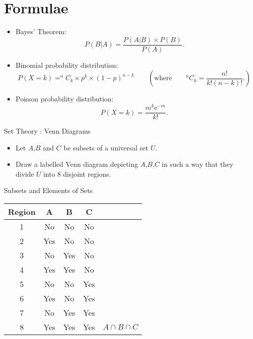 \section*{Formulae}
\begin{itemize}




\item Bayes' Theorem:
\begin{equation*}
P(B|A)=\frac{P\left(A|B\right) \times P(B) }{P\left( A\right) }.
\end{equation*}



\item Binomial probability distribution:
\begin{equation*}
P(X = k) = ^{n}C_{k} \times p^{k} \times \left( 1-p\right) ^{n-k}\qquad \left( \text{where}\qquad
^{n}C_{k} =\frac{n!}{k!\left(n-k\right) !}. \right)
\end{equation*}

\item Poisson probability distribution:
\begin{equation*}
P(X = k) =\frac{m^{k}\mathrm{e}^{-m}}{k!}.
\end{equation*}
\end{itemize}




{Set Theory : Venn Diagrams}

\begin{itemize}
\item Let $A$,$B$ and $C$ be subsets of a universal set $U$.
\item Draw a labelled Venn diagram depicting $A$,$B$,$C$ in such a way that they divide $U$ into 8 disjoint regions.
\end{itemize}



{Subsets and Elements of Sets}

\begin{center}
\begin{tabular}{|c|c|c|c|c|}
\hline Region & A & B & C &  \\ 
\hline 1 &\phantom{sp} No \phantom{sp}&\phantom{sp} No\phantom{sp} & \phantom{sp} No \phantom{sp} &  \\ 
\hline 2 & Yes & No & No &  \\ 
\hline 3 & No & Yes & No &  \\ 
\hline 4 & Yes & Yes & No &  \\ 
\hline 5 & No & No & Yes &  \\ 
\hline 6 & Yes & No & Yes &  \\ 
\hline 7 & No & Yes & Yes &  \\ 
\hline 8 & Yes & Yes & Yes & $A \cap B \cap C$ \\ 
\hline 
\end{tabular}
\end{center} 

